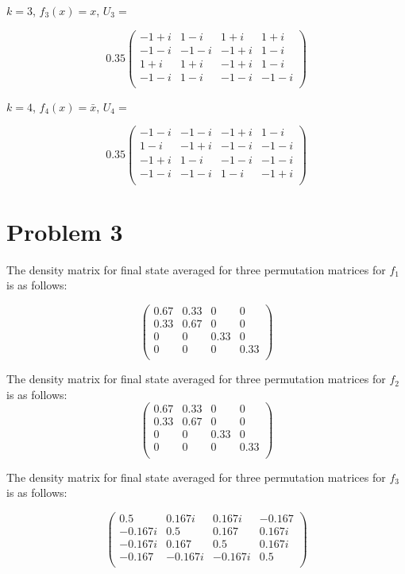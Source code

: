 \documentclass[11pt]{article}
\begin{document}
\noindent
$k=3$, \(f_3(x) = x\), $U_3 = $

\[
0.35
\begin{pmatrix}
-1+i & 1-i & 1+i & 1+i \\
-1-i & -1-i & -1+i & 1-i \\
1+i & 1+i & -1+i & 1-i \\
-1-i & 1-i & -1-i & -1-i \\
\end{pmatrix}
\]

\noindent
$k=4$, \(f_4(x) = \bar{x}\), $U_4 = $

\[
0.35
\begin{pmatrix}
-1-i & -1-i & -1+i & 1-i \\
1-i & -1+i & -1-i & -1-i \\
-1+i & 1-i & -1-i & -1-i \\
-1-i & -1-i & 1-i & -1+i \\
\end{pmatrix}
\]

\section*{Problem 3}
The density matrix for final state averaged for three permutation matrices for $f_1$ is as follows:

\[
\begin{pmatrix}
0.67 & 0.33 & 0 & 0 \\
0.33 & 0.67 & 0 & 0 \\
0 & 0 & 0.33 & 0 \\
0 & 0 & 0 & 0.33 \\
\end{pmatrix}
\]

The density matrix for final state averaged for three permutation matrices for $f_2$ is as follows:
\[
\begin{pmatrix}
    0.67 & 0.33 & 0 & 0 \\
    0.33 & 0.67 & 0 & 0 \\
    0 & 0 & 0.33 & 0 \\
    0 & 0 & 0 & 0.33 \\
    \end{pmatrix}
\]

The density matrix for final state averaged for three permutation matrices for $f_3$ is as follows:

\[
\begin{pmatrix}
0.5 & 0.167i & 0.167i & -0.167 \\
-0.167i & 0.5 & 0.167 & 0.167i \\
-0.167i & 0.167 & 0.5 & 0.167i \\
-0.167 & -0.167i & -0.167i & 0.5 \\
\end{pmatrix}
\]
\end{document}
